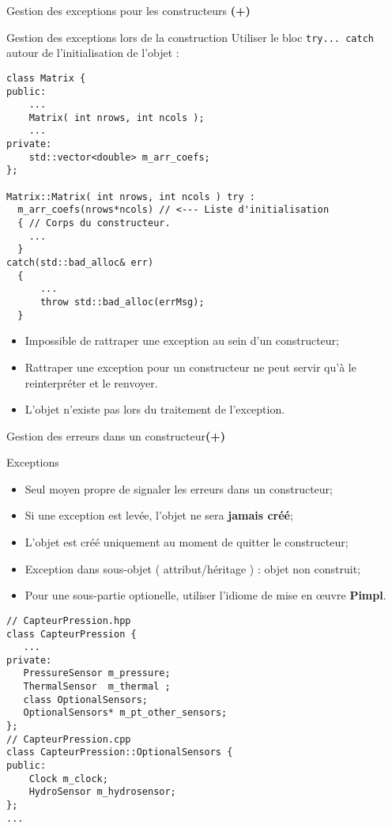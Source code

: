\documentclass[handout,10pt]{beamer}
\begin{document}
\begin{frame}[fragile]{Gestion des exceptions pour les constructeurs {\color{red}\bf\Large (+)}}

\begin{block}{Gestion des exceptions lors de la construction}
Utiliser le bloc \lstinline{try... catch} autour de l'initialisation de l'objet :
\begin{lstlisting}
class Matrix { 
public: 
    ...
    Matrix( int nrows, int ncols );
    ...
private: 
    std::vector<double> m_arr_coefs; 
};
    
Matrix::Matrix( int nrows, int ncols ) try :
  m_arr_coefs(nrows*ncols) // <--- Liste d'initialisation
  { // Corps du constructeur.
    ...
  }
catch(std::bad_alloc& err)
  {
      ...
      throw std::bad_alloc(errMsg);
  }  
\end{lstlisting}
\begin{itemize}
\item Impossible de rattraper une exception au sein d'un constructeur;
\item Rattraper une exception pour un constructeur ne peut servir qu'à le reinterpréter et le renvoyer.
\item L'objet n'existe pas lors du traitement de l'exception.
\end{itemize}
\end{block}
\end{frame}

\begin{frame}[fragile]{Gestion des erreurs dans un constructeur{\color{red}\bf\Large (+)}}
\tiny
\begin{block}{Exceptions}
\begin{itemize}
\item Seul moyen propre de signaler les erreurs dans un constructeur;
\item Si une exception est levée, l'objet ne sera \textbf{jamais créé};
\item L'objet est créé uniquement au moment de quitter le constructeur;
\item Exception dans sous-objet ( attribut/héritage ) : objet non construit;
\item Pour une sous-partie optionelle, utiliser l'idiome de mise en {\oe}uvre \textbf{Pimpl}.
\end{itemize}
\end{block}
\begin{lstlisting}
// CapteurPression.hpp
class CapteurPression {
   ...
private:
   PressureSensor m_pressure;
   ThermalSensor  m_thermal ;
   class OptionalSensors;
   OptionalSensors* m_pt_other_sensors;
};
// CapteurPression.cpp
class CapteurPression::OptionalSensors {
public:
    Clock m_clock;
    HydroSensor m_hydrosensor;
};
...
\end{lstlisting}
\end{frame}
\end{document}
